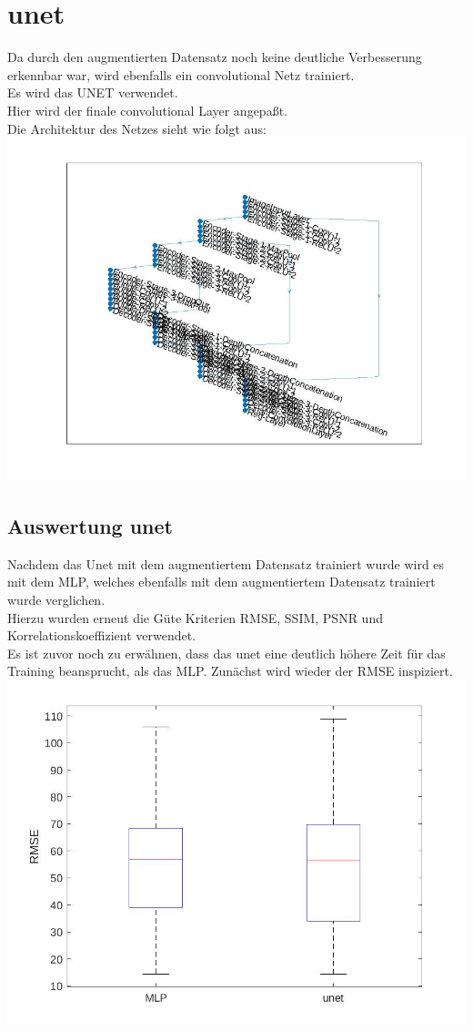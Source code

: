\documentclass[8pt,a4paper]{article}
\begin{document}
\section{unet}
Da durch den augmentierten Datensatz noch keine deutliche Verbesserung erkennbar war, wird ebenfalls ein convolutional Netz trainiert.\\
Es wird das UNET verwendet.\\
Hier wird der finale convolutional Layer angepaßt.\\
Die Architektur des Netzes sieht wie folgt aus:\\
\includegraphics[scale=0.2]{unetlayers.jpg}

\subsection{Auswertung unet}
Nachdem das Unet mit dem augmentiertem Datensatz trainiert wurde wird es mit dem MLP, welches ebenfalls mit dem augmentiertem Datensatz trainiert wurde verglichen.\\
Hierzu wurden erneut die Güte Kriterien RMSE, SSIM, PSNR und Korrelationskoeffizient verwendet.\\
Es ist zuvor noch zu erwähnen, dass das unet eine deutlich höhere Zeit für das Training beansprucht, als das MLP.
Zunächst wird wieder der RMSE inspiziert.\\
\includegraphics[scale=0.2]{boxplotUnetRMSE.jpg}
\end{document}
